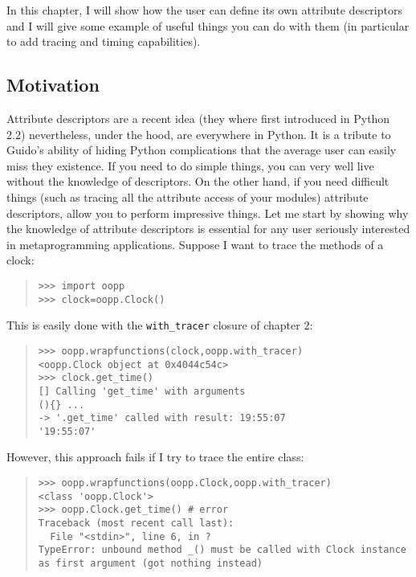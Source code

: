 \documentclass[10pt,english]{article}
\begin{document}
In this chapter, I will show how the user can define its own attribute 
descriptors and I will give some example of useful things you can do with 
them (in particular to add tracing and timing capabilities).



\hypertarget{motivation}{}
\subsection*{Motivation}

Attribute descriptors are a recent idea (they where first introduced in 
Python 2.2) nevertheless, under the hood, are everywhere in Python. It is 
a tribute to Guido's ability of hiding Python complications that
the average user can easily miss they existence.
If you need to do simple things, you can very well live without 
the knowledge of descriptors. On the other hand, if you need difficult 
things (such as tracing all the attribute access of your modules) 
attribute descriptors, allow you to perform 
impressive things. 
Let me start by showing why the knowledge of attribute descriptors is 
essential for any user seriously interested  in metaprogramming applications.
Suppose I  want to trace the methods of a clock:
\begin{quote}
\begin{verbatim}>>> import oopp
>>> clock=oopp.Clock()\end{verbatim}
\end{quote}

This is easily done with the \texttt{with{\_}tracer} closure of chapter 2:
\begin{quote}
\begin{verbatim}>>> oopp.wrapfunctions(clock,oopp.with_tracer)
<oopp.Clock object at 0x4044c54c>
>>> clock.get_time()
[] Calling 'get_time' with arguments
(){} ...
-> '.get_time' called with result: 19:55:07
'19:55:07'\end{verbatim}
\end{quote}

However, this approach fails if I try to trace the entire class:
\begin{quote}
\begin{verbatim}>>> oopp.wrapfunctions(oopp.Clock,oopp.with_tracer)
<class 'oopp.Clock'>
>>> oopp.Clock.get_time() # error
Traceback (most recent call last):
  File "<stdin>", line 6, in ?
TypeError: unbound method _() must be called with Clock instance 
as first argument (got nothing instead)\end{verbatim}
\end{quote}
\end{document}
